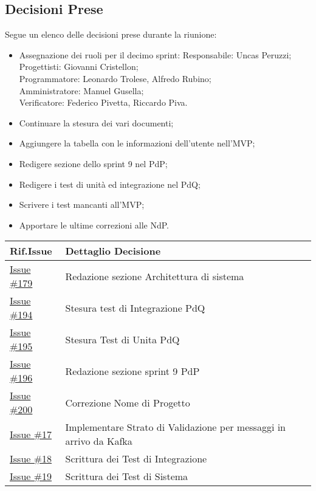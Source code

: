 \documentclass[10pt]{article}
\begin{document}
\subsection{Decisioni Prese}
Segue un elenco delle decisioni prese durante la riunione:
\begin{itemize}
    \item   Assegnazione dei ruoli per il decimo sprint:
            Responsabile: Uncas Peruzzi;\\
            Progettisti: Giovanni Cristellon;\\
            Programmatore: Leonardo Trolese, Alfredo Rubino;\\
            Amministratore: Manuel Gusella;\\
            Verificatore: Federico Pivetta, Riccardo Piva.
    \item Continuare la stesura dei vari documenti;
    \item Aggiungere la tabella con le informazioni dell'utente nell'MVP;
    \item Redigere sezione dello sprint 9 nel PdP;
    \item Redigere i test di unità ed integrazione nel PdQ;
    \item Scrivere i test mancanti all'MVP;
    \item Apportare le ultime correzioni alle NdP.
\end{itemize}

\begin{center}
    \begin{tabular}{|>{\centering\arraybackslash}m{3cm}|>{\centering\arraybackslash}m{12cm}|}
	\hline
	\textbf{Rif.Issue} & \textbf{Dettaglio Decisione}\\
	\hline  
            \href{https://github.com/SevenBitsSwe/7BitsDocs/issues/179}{Issue \#179} & Redazione sezione Architettura di sistema\\
        \hline
            \href{https://github.com/SevenBitsSwe/7BitsDocs/issues/194}{Issue \#194} & Stesura test di Integrazione PdQ\\
        \hline
            \href{https://github.com/SevenBitsSwe/7BitsDocs/issues/195}{Issue \#195} & Stesura Test di Unita PdQ\\
        \hline
            \href{https://github.com/SevenBitsSwe/7BitsDocs/issues/196}{Issue \#196} & Redazione sezione sprint 9 PdP\\
        \hline
            \href{https://github.com/SevenBitsSwe/7BitsDocs/issues/200}{Issue \#200} & Correzione Nome di Progetto\\
        \hline
            \href{https://github.com/SevenBitsSwe/MVP/issues/17}{Issue \#17} & Implementare Strato di Validazione per messaggi in arrivo da Kafka\\
        \hline
            \href{https://github.com/SevenBitsSwe/MVP/issues/18}{Issue \#18} & Scrittura dei Test di Integrazione\\
        \hline
            \href{https://github.com/SevenBitsSwe/MVP/issues/19}{Issue \#19} & Scrittura dei Test di Sistema\\
        \hline
    \end{tabular}
\end{center}
\end{document}
